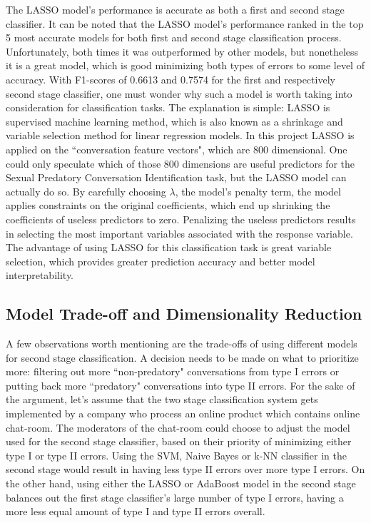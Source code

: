 \documentclass[11pt]{article}
\begin{document}
The LASSO model's performance is accurate as both a first and second stage classifier. It can be noted that the LASSO model's performance ranked in the top 5 most accurate models for both first and second stage classification process. Unfortunately, both times it was outperformed by other models, but nonetheless it is a great model, which is good minimizing both types of errors to some level of accuracy. With F1-scores of 0.6613 and 0.7574 for the first and respectively second stage classifier, one must wonder why such a model is worth taking into consideration for classification tasks. The explanation is simple: LASSO is supervised machine learning method, which is also known as a shrinkage and variable selection method for linear regression models. In this project LASSO is applied on the ``conversation feature vectors", which are 800 dimensional. One could only speculate which of those 800 dimensions are useful predictors for the Sexual Predatory Conversation Identification task, but the LASSO model can actually do so. By carefully choosing $\lambda$, the model's penalty term, the model applies constraints on the original coefficients, which end up shrinking the coefficients of useless predictors to zero. Penalizing the useless predictors results in selecting the most important variables associated with the response variable. The advantage of using LASSO for this classification task is great variable selection, which provides greater prediction accuracy and better model interpretability.

\subsection{Model Trade-off and Dimensionality Reduction}
A few observations worth mentioning are the trade-offs of using different models for second stage classification. A decision needs to be made on what to prioritize more: filtering out more ``non-predatory" conversations from type I errors or putting back more ``predatory" conversations into type II errors. For the sake of the argument, let's assume that the two stage classification system gets implemented by a company who process an online product which contains online chat-room. The moderators of the chat-room could choose to adjust the model used for the second stage classifier, based on their priority of minimizing either type I or type II errors. Using the SVM, Naive Bayes or k-NN classifier in the second stage would result in having less type II errors over more type I errors. On the other hand, using either the LASSO or AdaBoost model in the second stage balances out the first stage classifier's large number of type I errors, having a more less equal amount of type I and type II errors overall.
\end{document}
